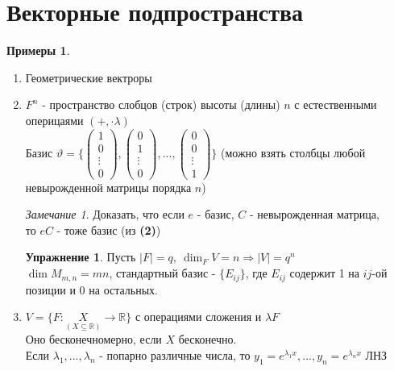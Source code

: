 \documentclass[a4paper, 12pt]{article}
\newcommand{\R}{\mathbb R}
\newcommand\tab[1][.5cm]{\hspace*{#1}}
\theoremstyle{definition}
\newtheorem*{example}{Примеры}
\newtheorem*{exercise}{Упражнение}
\theoremstyle{plain}
\theoremstyle{remark}
\newtheorem*{remark}{Замечание}
\begin{document}
  \section{Векторные подпространства}
  \begin{example} \tab
    \begin{enumerate}
      \item Геометрические вектроры
      \item $F^n$ - пространство слобцов (строк) высоты (длины) $n$ с естественными оперицаями $(+, \cdot \lambda)$ \vspace{0.4cm}\\
      Базис $\vartheta  = \Bigg\{ \begin{pmatrix}
        1 \\ 0 \\ \vdots \\ 0
      \end{pmatrix}, \begin{pmatrix}
        0 \\ 1 \\ \vdots \\ 0
      \end{pmatrix}, ... , \begin{pmatrix}
        0 \\ 0 \\ \vdots \\ 1
      \end{pmatrix} \Bigg\}$ (можно взять столбцы любой\vspace{0.3cm}\\ невырожденной матрицы порядка $n$)
      \begin{remark}
        Доказать, что если $e$ - базис, $C$ - невырожденная матрица,\\ то $eC$ - тоже базис (из \textbf{(2)})
      \end{remark} 
      \begin{exercise}
        Пусть $|F| = q, \ \dim_F V = n \Longrightarrow |V| = q^n$\\
        $\dim M_{m,n} = mn$, стандартный базис - $\{E_{ij}\}$, где $E_{ij}$ содержит 1 на $ij$-ой позиции и $0$ на остальных.  
      \end{exercise}
      \item $V = \{F:\underset{(X\subseteq \R)}{X} \to \R\}$ с операциями сложения и $\lambda F$\\
      Оно бесконечномерно, если $X$ бесконечно.\\
      Если $\lambda_1, ..., \lambda_n$ - попарно различные числа, то $y_1 = e^{\lambda_1x},..., y_n = e^{\lambda_nx}$ ЛНЗ\\

\end{enumerate}
\end{example}
\end{document}
